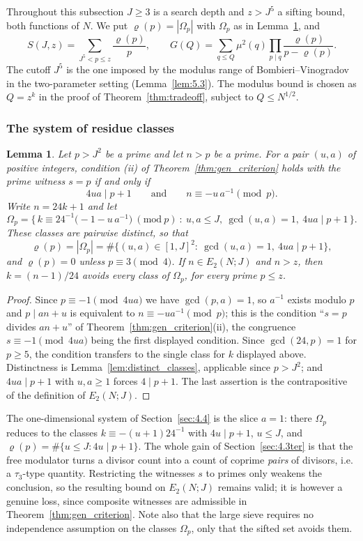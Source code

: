 \documentclass[11pt, a4paper]{article}
\theoremstyle{plain}
\newtheorem{lemma}[theorem]{Lemma}
\theoremstyle{definition}
\begin{document}
Throughout this subsection $J\ge3$ is a search depth and $z>J^{5}$ a sifting bound, both functions of $N$. We put $\varrho(p)=|\Omega_p|$ with $\Omega_p$ as in Lemma~\ref{lem:5.10}, and
\begin{equation} \label{eq:5.2.0}
S(J,z) = \sum_{J^5 < p \le z} \frac{\varrho(p)}{p}, \qquad G(Q) = \sum_{q \le Q} \mu^2(q) \prod_{p \mid q} \frac{\varrho(p)}{p-\varrho(p)} .
\end{equation}
The cutoff $J^{5}$ is the one imposed by the modulus range of Bombieri--Vinogradov in the two-parameter setting (Lemma~\ref{lem:5.3}). The modulus bound is chosen as $Q=z^{k}$ in the proof of Theorem~\ref{thm:tradeoff}, subject to $Q\le N^{1/2}$.

\subsubsection{The system of residue classes} \label{sec:5.2.0}

\begin{lemma} \label{lem:5.10}
Let $p>J^{2}$ be a prime and let $n>p$ be a prime. For a pair $(u,a)$ of positive integers, condition (ii) of Theorem~\ref{thm:gen_criterion} holds with the prime witness $s=p$ if and only if
$$4ua\mid p+1\qquad\text{and}\qquad n\equiv-u\,a^{-1}\pmod p .$$
Write $n=24k+1$ and let
$$\Omega_p=\Big\{\,k\equiv 24^{-1}\big(-1-u\,a^{-1}\big)\ (\mathrm{mod}\ p)\ :\ u,a\le J,\ \gcd(u,a)=1,\ 4ua\mid p+1\,\Big\}.$$
These classes are pairwise distinct, so that
$$\varrho(p)=|\Omega_p|=\#\big\{(u,a)\in[1,J]^{2}:\ \gcd(u,a)=1,\ 4ua\mid p+1\big\},$$
and $\varrho(p)=0$ unless $p\equiv3\pmod4$. If $n\in E_2(N;J)$ and $n>z$, then $k=(n-1)/24$ avoids every class of $\Omega_p$, for every prime $p\le z$.
\end{lemma}
\begin{proof}
Since $p\equiv-1\pmod{4ua}$ we have $\gcd(p,a)=1$, so $a^{-1}$ exists modulo $p$ and $p\mid an+u$ is equivalent to $n\equiv-ua^{-1}\pmod p$; this is the condition ``$s=p$ divides $an+u$'' of Theorem~\ref{thm:gen_criterion}(ii), the congruence $s\equiv-1\pmod{4ua}$ being the first displayed condition. Since $\gcd(24,p)=1$ for $p\ge5$, the condition transfers to the single class for $k$ displayed above. Distinctness is Lemma~\ref{lem:distinct_classes}, applicable since $p>J^{2}$; and $4ua\mid p+1$ with $u,a\ge1$ forces $4\mid p+1$. The last assertion is the contrapositive of the definition of $E_2(N;J)$.
\end{proof}

The one-dimensional system of Section~\ref{sec:4.4} is the slice $a=1$: there $\Omega_p$ reduces to the classes $k\equiv-(u+1)24^{-1}$ with $4u\mid p+1$, $u\le J$, and $\varrho(p)=\#\{u\le J:4u\mid p+1\}$. The whole gain of Section~\ref{sec:4.3ter} is that the free modulator turns a divisor count into a count of coprime \emph{pairs} of divisors, i.e. a $\tau_3$-type quantity. Restricting the witnesses $s$ to primes only weakens the conclusion, so the resulting bound on $E_2(N;J)$ remains valid; it is however a genuine loss, since composite witnesses are admissible in Theorem~\ref{thm:gen_criterion}. Note also that the large sieve requires no independence assumption on the classes $\Omega_p$, only that the sifted set avoids them.
\end{document}
